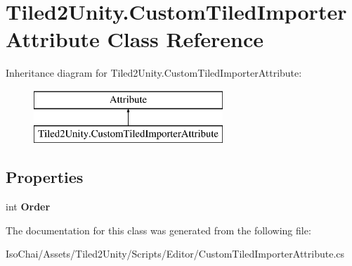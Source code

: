 \hypertarget{class_tiled2_unity_1_1_custom_tiled_importer_attribute}{}\section{Tiled2\+Unity.\+Custom\+Tiled\+Importer\+Attribute Class Reference}
\label{class_tiled2_unity_1_1_custom_tiled_importer_attribute}
Inheritance diagram for Tiled2\+Unity.\+Custom\+Tiled\+Importer\+Attribute\+:\begin{figure}[H]
\begin{center}
\leavevmode
\includegraphics[height=2.000000cm]{class_tiled2_unity_1_1_custom_tiled_importer_attribute}
\end{center}
\end{figure}
\subsection*{Properties}
\begin{DoxyCompactItemize}
\item 
\mbox{\label{class_tiled2_unity_1_1_custom_tiled_importer_attribute_ad1ed82004dd88b76c48c01094e871752}} 
int {\bfseries Order}
\end{DoxyCompactItemize}


The documentation for this class was generated from the following file\+:\begin{DoxyCompactItemize}
\item 
Iso\+Chai/\+Assets/\+Tiled2\+Unity/\+Scripts/\+Editor/Custom\+Tiled\+Importer\+Attribute.\+cs\end{DoxyCompactItemize}
